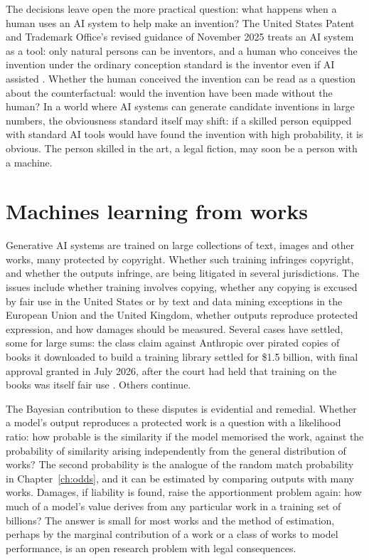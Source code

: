 The decisions leave open the more practical question: what happens when a human uses an AI system to help make an invention? The United States Patent and Trademark Office's revised guidance of November 2025 treats an AI system as a tool: only natural persons can be inventors, and a human who conceives the invention under the ordinary conception standard is the inventor even if AI assisted \citep{uspto2025}. Whether the human conceived the invention can be read as a question about the counterfactual: would the invention have been made without the human? In a world where AI systems can generate candidate inventions in large numbers, the obviousness standard itself may shift: if a skilled person equipped with standard AI tools would have found the invention with high probability, it is obvious. The person skilled in the art, a legal fiction, may soon be a person with a machine.

\section{Machines learning from works}

Generative AI systems are trained on large collections of text, images and other works, many protected by copyright. Whether such training infringes copyright, and whether the outputs infringe, are being litigated in several jurisdictions. The issues include whether training involves copying, whether any copying is excused by fair use in the United States or by text and data mining exceptions in the European Union and the United Kingdom, whether outputs reproduce protected expression, and how damages should be measured. Several cases have settled, some for large sums: the class claim against Anthropic over pirated copies of books it downloaded to build a training library settled for \$1.5 billion, with final approval granted in July 2026, after the court had held that training on the books was itself fair use \citep{bartz2026}. Others continue.

The Bayesian contribution to these disputes is evidential and remedial. Whether a model's output reproduces a protected work is a question with a likelihood ratio: how probable is the similarity if the model memorised the work, against the probability of similarity arising independently from the general distribution of works? The second probability is the analogue of the random match probability in Chapter~\ref{ch:odds}, and it can be estimated by comparing outputs with many works. Damages, if liability is found, raise the apportionment problem again: how much of a model's value derives from any particular work in a training set of billions? The answer is small for most works and the method of estimation, perhaps by the marginal contribution of a work or a class of works to model performance, is an open research problem with legal consequences.

